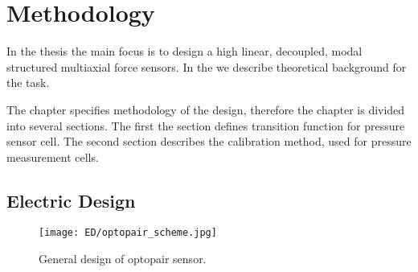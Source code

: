 \chapter{Methodology}
\label{chapter:methodology}
In the thesis the main focus is to design a high linear, decoupled, modal structured multiaxial force sensors.
In the  we describe theoretical background for the
task. 

The chapter specifies methodology of the design, therefore the chapter is divided into several sections. The first the  section 
defines transition function for pressure sensor cell. The second section  describes the calibration method, used for pressure measurement cells.


\section{Electric Design}
\begin{figure}[H]
  \centering
  \texttt{[image: ED/optopair\_scheme.jpg]}
  \label{fig:optopair_scheme}
  \caption{General design of optopair sensor.}
\end{figure}

